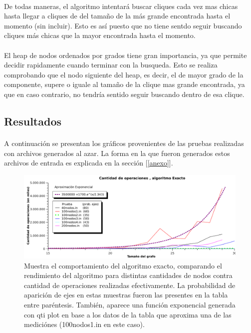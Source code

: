 \paragraph{}
De todas maneras, el algoritmo intentará buscar cliques cada vez mas chicas hasta llegar a cliques de del tamaño de la más grande encontrada hasta el momento (sin incluir). Esto es así puesto que no tiene sentdo seguir buscando cliques más chicas que la mayor encontrada hasta el momento. 

\paragraph{}
El heap de nodos ordenados por grados tiene gran importancia, ya que permite decidir rapidamente cuando terminar con la busqueda. Esto se realiza comprobando que el nodo siguiente del heap, es decir, el de mayor grado de la componente, supere o iguale al tamaño de la clique mas grande encontrada, ya que en caso contrario, no tendría sentido seguir buscando dentro de esa clique.
\clearpage

\newpage

\subsection{Resultados}

\paragraph{}
A continuación se presentan los gráficos provenientes de las pruebas realizadas con archivos generados al azar. La forma en la que fueron generados estos archivos de entrada es explicada en la sección [\ref{anexo}].
\begin{figure}[h]
    \begin{minipage}{\textwidth}
	\begin{center}
		\includegraphics[width=\textwidth]{./otros/graficos/operaciones_ej2.pdf}
		\caption{Muestra el comportamiento del algoritmo exacto, comparando el rendimiento del algoritmo para distintas cantidades de nodos contra cantidad de operaciones realizadas efectivamente. La probabilidad de aparición de ejes en estas muestras fueron las presentes en la tabla entre paréntesis. También, aparece una función exponencial generada con qti plot en base a los datos de la tabla que aproxima una de las mediciónes (100nodos1.in en este caso).}
		\label{ej2contarOp}
	\end{center}
    \end{minipage}

\end{figure}


